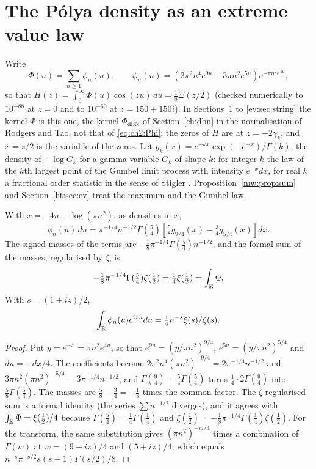 \section{The P\'olya density as an extreme value law}\label{ev:sec:decomp}

Write
\[
\Phi(u) = \sum_{n\ge1}\phi_n(u), \qquad \phi_n(u) = \left(2\pi^2n^4e^{9u} - 3\pi n^2e^{5u}\right)e^{-\pi n^2e^{4u}},
\]
so that $H(z) = \int_0^\infty\Phi(u)\cos(zu)\,du = \tfrac18\Xi(z/2)$ (checked numerically to $10^{-88}$ at $z=0$ and to $10^{-60}$ at $z=150+150i$). In Sections~\ref{ev:sec:decomp} to \ref{ev:sec:string} the kernel $\Phi$ is this one, the kernel $\Phi_{\mathrm{dBN}}$ of Section~\ref{ch:dbn} in the normalisation of Rodgers and Tao, not that of \eqref{eq:ch2:Phi}; the zeros of $H$ are at $z=\pm2\gamma_k$, and $x=z/2$ is the variable of the zeros. Let $g_k(x) = e^{-kx}\exp(-e^{-x})/\Gamma(k)$, the density of $-\log G_k$ for a gamma variable $G_k$ of shape $k$: for integer $k$ the law of the $k$th largest point of the Gumbel limit process with intensity $e^{-x}dx$, for real $k$ a fractional order statistic in the sense of Stigler \cite{Stigler77}. Proposition~\ref{mw:prop:sum} and Section~\ref{ht:sec:ev} treat the maximum and the Gumbel law.

\begin{theorem}\label{ev:thm:decomp}
With $x = -4u - \log(\pi n^2)$, as densities in $x$,
\[
\phi_n(u)\,du = \pi^{-1/4}n^{-1/2}\Gamma(\tfrac54)\left[\tfrac58 g_{9/4}(x) - \tfrac34 g_{5/4}(x)\right]dx .
\]
The signed masses of the terms are $-\tfrac18\pi^{-1/4}\Gamma(\tfrac54)n^{-1/2}$, and the formal sum of the masses, regularised by $\zeta$, is
\[
-\tfrac18\pi^{-1/4}\Gamma(\tfrac54)\zeta(\tfrac12) = \tfrac14\xi(\tfrac12) = \int_{\mathbb{R}}\Phi .
\]
With $s = (1+iz)/2$,
\[
\int_{\mathbb{R}}\phi_n(u)e^{izu}du = \tfrac14 n^{-s}\xi(s)/\zeta(s).
\]
\end{theorem}

\begin{proof}
Put $y=e^{-x}=\pi n^2e^{4u}$, so that $e^{9u}=(y/\pi n^2)^{9/4}$, $e^{5u}=(y/\pi n^2)^{5/4}$ and $du=-dx/4$. The coefficients become $2\pi^2n^4(\pi n^2)^{-9/4}=2\pi^{-1/4}n^{-1/2}$ and $3\pi n^2(\pi n^2)^{-5/4}=3\pi^{-1/4}n^{-1/2}$, and $\Gamma(\tfrac94)=\tfrac54\Gamma(\tfrac54)$ turns $\tfrac14\cdot2\Gamma(\tfrac94)$ into $\tfrac58\Gamma(\tfrac54)$. The masses are $\tfrac58-\tfrac34=-\tfrac18$ times the common factor. The $\zeta$ regularised sum is a formal identity (the series $\sum n^{-1/2}$ diverges), and it agrees with $\int_{\mathbb{R}}\Phi=\xi(\tfrac12)/4$ because $\Gamma(\tfrac54)=\tfrac14\Gamma(\tfrac14)$ and $\xi(\tfrac12)=-\tfrac18\pi^{-1/4}\Gamma(\tfrac14)\zeta(\tfrac12)$. For the transform, the same substitution gives $(\pi n^2)^{-iz/4}$ times a combination of $\Gamma(w)$ at $w=(9+iz)/4$ and $(5+iz)/4$, which equals $n^{-s}\pi^{-s/2}s(s-1)\Gamma(s/2)/8$.
\end{proof}

